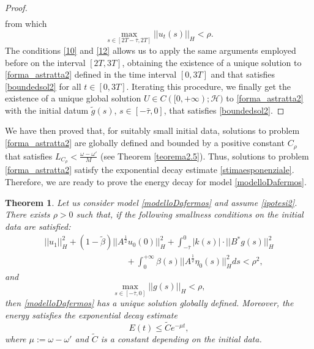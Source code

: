 \documentclass[11pt]{article}
\newtheorem{Theorem}{Theorem}[section]
\renewcommand{\leq}{\leqslant}
\begin{document}
\begin{proof}
$$\begin{array}{l}
\end{array}$$
from which 
\begin{equation}\label{12}
	\max_{s\in [2T-\bar{\tau},2T]}||u_t(s)||_H<\rho.
\end{equation}
The conditions \eqref{10} and \eqref{12} allows us to apply the same arguments employed before on the interval $[2T,3T]$, obtaining the existence of a unique solution to \eqref{forma_astratta2} defined in the time interval $[0,3T]$ and that satisfies \eqref{boundedsol2} for all $t\in [0,3T]$. Iterating this procedure, we finally get the existence of a unique global solution $U\in C([0,+\infty);\mathcal{H})$ to \eqref{forma_astratta2} with the initial datum $\tilde{g}(s)$, $s\in [-\bar{\tau},0]$, that satisfies \eqref{boundedsol2}.
\end{proof}	
We have then proved that, for suitably small initial data, solutions to problem  \eqref{forma_astratta2} are globally defined and bounded by a positive constant $C_{\rho}$ that satisfies $L_{C_{\rho}}<\frac{\omega-\omega'}{M}$ (see Theorem \ref{teorema2.5}). Thus, solutions to problem  \eqref{forma_astratta2} satisfy the exponential decay estimate \eqref{stimaesponenziale}. Therefore, we are ready to prove  the energy decay
for model \eqref{modelloDafermos}.

\begin{Theorem}\label{teorema_finale}
Let us consider model \eqref{modelloDafermos} and assume \eqref{ipotesi2}. There exists $\rho>0$ such that,
if the following smallness conditions on  the initial data are satisfied:
\begin{equation}\label{ipotesi}
\begin{array}{l}
	\displaystyle{||u_1||^2_{H}+(1-\tilde{\beta})||A^{\frac{1}{2}}u_0(0)||^2_{H}+\int_{-\bar\tau}^0|k(s)|\cdot||B^*g(s)||^2_{H}}\\
	\displaystyle{\hspace{4cm}+\int_{0}^{+\infty}\beta(s)||A^{\frac{1}{2}}\eta_0(s)||^2_{H}ds<\rho^2,}
\end{array}
\end{equation}
and
\begin{equation}\label{ipotesi_bis}
\displaystyle{\max_{s\in [-\bar{\tau},0]}||g(s)||_{H}<\rho,}
\end{equation}
then \eqref{modelloDafermos} has a unique solution  globally defined. Moreover, the energy satisfies the exponential decay estimate
\begin{equation}
\label{tesi}
E(t)\leq \tilde{C}e^{-\mu t},
\end{equation}
where $\mu:=\omega-\omega'$ and $\tilde C$ is a constant depending on the initial data.
\end{Theorem}
\end{document}
